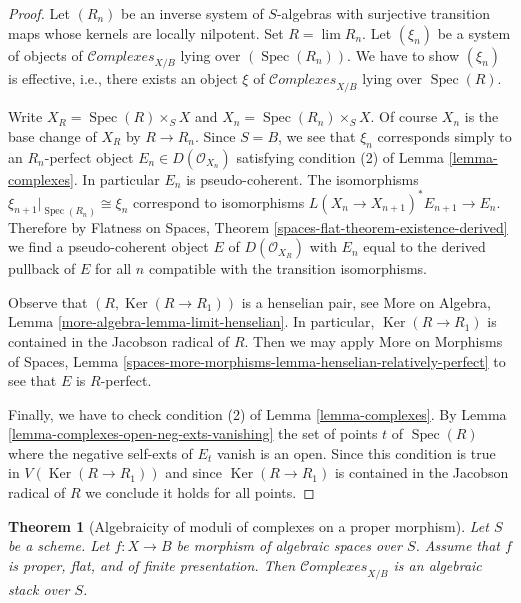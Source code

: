 \documentclass{stacks-project}
\newenvironment{reference}{\comment}{\endcomment}
\theoremstyle{plain}
\newtheorem{theorem}[subsection]{Theorem}
\theoremstyle{definition}
\theoremstyle{remark}
\numberwithin{equation}{subsection}
\def\lim{\mathop{\mathrm{lim}}\nolimits}
\def\Spec{\mathop{\mathrm{Spec}}}
\def\Ker{\mathop{\mathrm{Ker}}}
\def\Complexesstack{\mathcal{C}\!\mathit{omplexes}}
\begin{document}
\begin{proof}
Let $(R_n)$ be an inverse system of $S$-algebras with surjective transition
maps whose kernels are locally nilpotent. Set $R = \lim R_n$.
Let $(\xi_n)$ be a system of objects of $\Complexesstack_{X/B}$
lying over $(\Spec(R_n))$. We have to show $(\xi_n)$ is effective, i.e.,
there exists an object $\xi$ of $\Complexesstack_{X/B}$ lying over
$\Spec(R)$.

\medskip\noindent
Write $X_R = \Spec(R) \times_S X$ and $X_n = \Spec(R_n) \times_S X$.
Of course $X_n$ is the base change of $X_R$ by $R \to R_n$. Since $S = B$,
we see that $\xi_n$ corresponds simply to an $R_n$-perfect object
$E_n \in D(\mathcal{O}_{X_n})$ satisfying condition (2) of
Lemma \ref{lemma-complexes}. In particular $E_n$ is pseudo-coherent.
The isomorphisms $\xi_{n + 1}|_{\Spec(R_n)} \cong \xi_n$
correspond to isomorphisms $L(X_n \to X_{n + 1})^*E_{n + 1} \to E_n$.
Therefore by
Flatness on Spaces, Theorem \ref{spaces-flat-theorem-existence-derived}
we find a pseudo-coherent object $E$ of $D(\mathcal{O}_{X_R})$
with $E_n$ equal to the derived pullback of $E$ for all $n$
compatible with the transition isomorphisms.

\medskip\noindent
Observe that $(R, \Ker(R \to R_1))$ is a henselian pair, see
More on Algebra, Lemma \ref{more-algebra-lemma-limit-henselian}.
In particular, $\Ker(R \to R_1)$ is contained in the Jacobson radical of $R$.
Then we may apply More on Morphisms of Spaces, Lemma
\ref{spaces-more-morphisms-lemma-henselian-relatively-perfect}
to see that $E$ is $R$-perfect.

\medskip\noindent
Finally, we have to check condition (2) of Lemma \ref{lemma-complexes}.
By Lemma \ref{lemma-complexes-open-neg-exts-vanishing}
the set of points $t$ of $\Spec(R)$ where the negative self-exts of $E_t$
vanish is an open. Since this condition is true in $V(\Ker(R \to R_1))$
and since $\Ker(R \to R_1)$ is contained in the Jacobson radical of $R$
we conclude it holds for all points.
\end{proof}

\begin{theorem}[Algebraicity of moduli of complexes on a proper morphism]
\label{theorem-complexes-algebraic}
\begin{reference}
\cite{lieblich-complexes}
\end{reference}
Let $S$ be a scheme. Let $f : X \to B$ be morphism of algebraic spaces
over $S$. Assume that $f$ is proper, flat, and of finite presentation.
Then $\Complexesstack_{X/B}$ is an algebraic stack over $S$.
\end{theorem}
\end{document}
